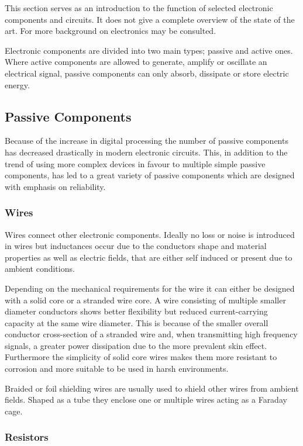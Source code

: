 This section serves as an introduction to the function of selected electronic components and circuits. It does not give a complete overview of the state of the art. For more background on electronics  may be consulted.

Electronic components are divided into two main types; passive and active ones. Where active components are allowed to generate, amplify or oscillate an electrical signal, passive components can only absorb, dissipate or store electric energy.

\subsection{Passive Components}

Because of the increase in digital processing the number of passive components has decreased drastically in modern electronic circuits. This, in addition to the trend of using more complex devices in favour to multiple simple passive components, has led to a great variety of passive components which are designed with emphasis on reliability.

\subsubsection{Wires}

Wires connect other electronic components. Ideally no loss or noise is introduced in wires but inductances occur due to the conductors shape and material properties as well as electric fields, that are either self induced or present due to ambient conditions.

Depending on the mechanical requirements for the wire it can either be designed with a solid core or a stranded wire core. A wire consisting of multiple smaller diameter conductors shows better flexibility but reduced current-carrying capacity at the same wire diameter. This is because of the smaller overall conductor cross-section of a stranded wire and, when transmitting high frequency signals, a greater power dissipation due to the more prevalent skin effect. Furthermore the simplicity of solid core wires makes them more resistant to corrosion and more suitable to be used in harsh environments.

Braided or foil shielding wires are usually used to shield other wires from ambient fields. Shaped as a tube they enclose one or multiple wires acting as a Faraday cage.

\subsubsection{Resistors}

